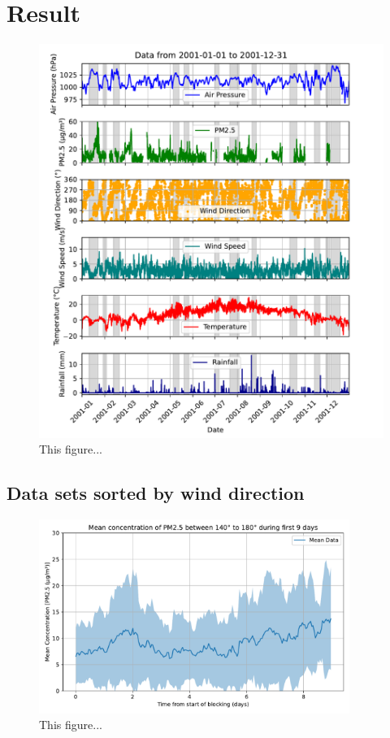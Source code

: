 \section{Result}

\begin{figure}[H]
    \centering    \includegraphics[width=1\textwidth]{Figures/plot_20010101_20011231.pdf}
    \caption{This figure...}
    \label{fig:example}
\end{figure}

\subsection{Data sets sorted by wind direction}

\begin{figure}[H]
    \centering    \includegraphics[width=0.9\textwidth]{Figures/Meanplot.pdf}
    \caption{This figure...}
    \label{fig:Meanplot}
\end{figure}

